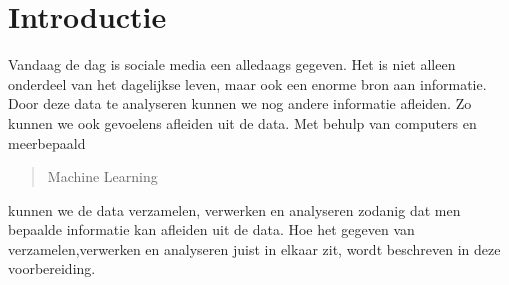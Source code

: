 \section{Introductie}\label{introductie}
Vandaag de dag is sociale media een alledaags gegeven. Het is niet alleen onderdeel van het dagelijkse leven, maar ook een enorme bron aan informatie.
Door deze data te analyseren kunnen we nog andere informatie afleiden. Zo kunnen we ook gevoelens afleiden uit de data. Met behulp van computers en meerbepaald \begin{quote}Machine Learning\end{quote} kunnen we de data verzamelen, verwerken en analyseren zodanig dat men bepaalde informatie kan afleiden uit de data.
Hoe het gegeven van verzamelen,verwerken en analyseren juist in elkaar zit, wordt beschreven in deze voorbereiding.
